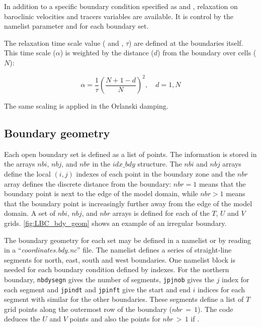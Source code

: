 \documentclass[../main/NEMO_manual]{subfiles}
\begin{document}
In addition to a specific boundary condition specified as  and , relaxation on baroclinic velocities and tracers variables are available.
It is control by the namelist parameter  and  for each boundary set.

The relaxation time scale value ( and , $\tau$) are defined at the boundaries itself.
This time scale ($\alpha$) is weighted by the distance ($d$) from the boundary over  cells ($N$):

\[
  \alpha = \frac{1}{\tau}(\frac{N+1-d}{N})^2,       \quad d=1,N
\]

The same scaling is applied in the Orlanski damping.

\subsection{Boundary geometry}
\label{subsec:LBC_bdy_geometry}

Each open boundary set is defined as a list of points.
The information is stored in the arrays $nbi$, $nbj$, and $nbr$ in the $idx\_bdy$ structure.
The $nbi$ and $nbj$ arrays define the local $(i,j)$ indexes of each point in the boundary zone and
the $nbr$ array defines the discrete distance from the boundary: $nbr=1$ means that
the boundary point is next to the edge of the model domain, while $nbr>1$ means that
the boundary point is increasingly further away from the edge of the model domain.
A set of $nbi$, $nbj$, and $nbr$ arrays is defined for each of the $T$, $U$ and $V$ grids.
\autoref{fig:LBC_bdy_geom} shows an example of an irregular boundary.

The boundary geometry for each set may be defined in a namelist  or
by reading in a ``\textit{coordinates.bdy.nc}'' file.
The  namelist defines a series of straight-line segments for north, east, south and west boundaries.
One  namelist block is needed for each boundary condition defined by indexes.
For the northern boundary, \texttt{nbdysegn} gives the number of segments,
\texttt{jpjnob} gives the $j$ index for each segment and \texttt{jpindt} and
\texttt{jpinft} give the start and end $i$ indices for each segment with similar for the other boundaries.
These segments define a list of $T$ grid points along the outermost row of the boundary ($nbr\,=\, 1$).
The code deduces the $U$ and $V$ points and also the points for $nbr\,>\, 1$ if .
\end{document}
